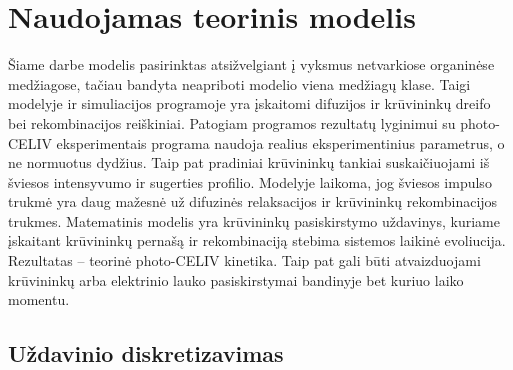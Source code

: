  
\section{Naudojamas teorinis modelis}

Šiame darbe modelis pasirinktas atsižvelgiant į vyksmus netvarkiose organinėse medžiagose, tačiau bandyta neapriboti modelio viena medžiagų klase. Taigi modelyje ir simuliacijos programoje yra įskaitomi difuzijos ir krūvininkų dreifo bei rekombinacijos reiškiniai. Patogiam programos rezultatų lyginimui su photo-CELIV eksperimentais programa naudoja realius eksperimentinius parametrus, o ne normuotus dydžius. Taip pat pradiniai krūvininkų tankiai suskaičiuojami iš šviesos intensyvumo ir sugerties profilio. Modelyje laikoma, jog šviesos impulso trukmė yra daug mažesnė už difuzinės relaksacijos ir krūvininkų rekombinacijos trukmes.
Matematinis modelis yra krūvininkų pasiskirstymo uždavinys, kuriame įskaitant krūvininkų pernašą ir rekombinaciją stebima sistemos laikinė evoliucija. Rezultatas -- teorinė photo-CELIV kinetika. Taip pat gali būti atvaizduojami krūvininkų arba elektrinio lauko pasiskirstymai bandinyje bet kuriuo laiko momentu.

\subsection{Uždavinio diskretizavimas}

